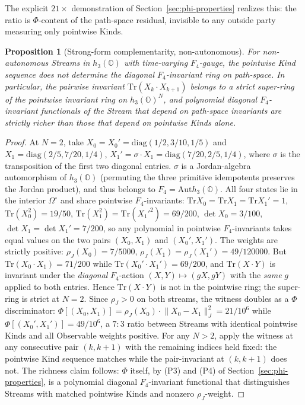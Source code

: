 \documentclass[12pt]{article}
\newtheorem{proposition}[theorem]{Proposition}
\theoremstyle{remark}
\newcommand{\hthree}{h_3(\mathbb{O})}
\newcommand{\Ffour}{F_4}
\newcommand{\rhoJ}{\rho_J}
\newcommand{\Phiexp}{\Phi}
\newcommand{\Aut}{\mathrm{Aut}}
\newcommand{\Tr}{\mathrm{Tr}}
\newcommand{\Jnorm}[1]{\lVert #1 \rVert_J}
\begin{document}
The explicit $21\times$ demonstration of
Section~\ref{sec:phi-properties} realizes this: the ratio is
$\Phiexp$-content of the path-space residual, invisible to any
outside party measuring only pointwise Kinds.

\begin{proposition}[Strong-form complementarity, non-autonomous]\label{prop:strong-comp}
For non-autonomous Streams in $\hthree$ with time-varying $\Ffour$-gauge,
the pointwise Kind sequence does \emph{not} determine the diagonal
$\Ffour$-invariant ring on path-space. In particular, the pairwise
invariant $\Tr(X_k \cdot X_{k+1})$ belongs to a strict super-ring of
the pointwise invariant ring on $\hthree^N$, and polynomial diagonal
$\Ffour$-invariant functionals of the Stream that depend on
path-space invariants are strictly richer than those that depend on
pointwise Kinds alone.
\end{proposition}

\begin{proof}[Proof]
At $N = 2$, take $X_0 = X_0' = \mathrm{diag}(1/2, 3/10, 1/5)$ and
$X_1 = \mathrm{diag}(2/5, 7/20, 1/4)$,
$X_1' = \sigma \cdot X_1 = \mathrm{diag}(7/20, 2/5, 1/4)$, where
$\sigma$ is the transposition of the first two diagonal entries.
$\sigma$ is a Jordan-algebra automorphism of $\hthree$ (permuting
the three primitive idempotents preserves the Jordan product), and
thus belongs to $\Ffour = \Aut\hthree$. All four states lie in the
interior $\Omega^\circ$ and share pointwise $\Ffour$-invariants:
$\Tr X_0 = \Tr X_1 = \Tr X_1' = 1$,
$\Tr(X_0^2) = 19/50$, $\Tr(X_1^2) = \Tr(X_1'^2) = 69/200$,
$\det X_0 = 3/100$, $\det X_1 = \det X_1' = 7/200$, so any
polynomial in pointwise $\Ffour$-invariants takes equal values on
the two pairs $(X_0, X_1)$ and $(X_0', X_1')$. The weights are
strictly positive: $\rhoJ(X_0) = 7/5000$,
$\rhoJ(X_1) = \rhoJ(X_1') = 49/120000$. But
$\Tr(X_0 \cdot X_1) = 71/200$ while $\Tr(X_0' \cdot X_1') = 69/200$,
and $\Tr(X \cdot Y)$ is invariant under the \emph{diagonal}
$\Ffour$-action $(X, Y) \mapsto (gX, gY)$ with the \emph{same}
$g$ applied to both entries. Hence $\Tr(X \cdot Y)$ is not in the
pointwise ring; the super-ring is strict at $N = 2$. Since
$\rhoJ > 0$ on both streams, the witness doubles as a $\Phiexp$
discriminator:
$\Phiexp[(X_0, X_1)] = \rhoJ(X_0) \cdot \Jnorm{X_0 - X_1}^2 =
21/10^6$ while $\Phiexp[(X_0', X_1')] = 49/10^6$, a $7{:}3$ ratio
between Streams with identical pointwise Kinds and all Observable
weights positive. For any $N > 2$, apply the witness at any
consecutive pair $(k, k+1)$ with the remaining indices held fixed:
the pointwise Kind sequence matches while the pair-invariant at
$(k, k+1)$ does not. The richness claim follows: $\Phiexp$ itself,
by (P3) and (P4) of Section~\ref{sec:phi-properties}, is a
polynomial diagonal $\Ffour$-invariant functional that
distinguishes Streams with matched pointwise Kinds and nonzero
$\rhoJ$-weight.
\end{proof}
\end{document}
